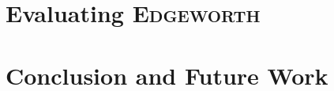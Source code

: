 \documentclass[12pt]{cmuthesis}
\newcommand*{\Edgeworth}{\textsc{Edgeworth}\xspace}
\begin{document}
\chapter{Evaluating \Edgeworth{}}
\label{chp:edgeworth-eval}


\chapter{Conclusion and Future Work}
\label{chp:conclusion}
% 

% 

\backmatter

\renewcommand{\baselinestretch}{1.0}\normalsize

\renewcommand{\bibsection}{\chapter{\bibname}}

\end{document}
